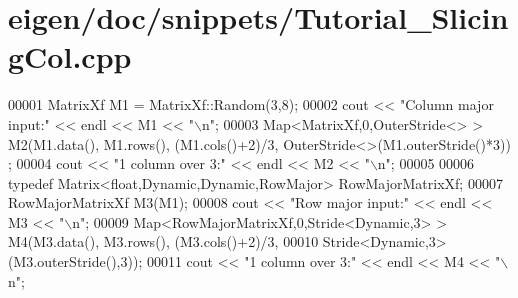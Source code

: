 \hypertarget{eigen_2doc_2snippets_2_tutorial___slicing_col_8cpp_source}{}\section{eigen/doc/snippets/\+Tutorial\+\_\+\+Slicing\+Col.cpp}
\label{eigen_2doc_2snippets_2_tutorial___slicing_col_8cpp_source}

\begin{DoxyCode}
00001 MatrixXf M1 = MatrixXf::Random(3,8);
00002 cout << \textcolor{stringliteral}{"Column major input:"} << endl << M1 << \textcolor{stringliteral}{"\(\backslash\)n"};
00003 Map<MatrixXf,0,OuterStride<> > M2(M1.data(), M1.rows(), (M1.cols()+2)/3, OuterStride<>(M1.outerStride()*3))
      ;
00004 cout << \textcolor{stringliteral}{"1 column over 3:"} << endl << M2 << \textcolor{stringliteral}{"\(\backslash\)n"};
00005 
00006 \textcolor{keyword}{typedef} Matrix<float,Dynamic,Dynamic,RowMajor> RowMajorMatrixXf;
00007 RowMajorMatrixXf M3(M1);
00008 cout << \textcolor{stringliteral}{"Row major input:"} << endl << M3 << \textcolor{stringliteral}{"\(\backslash\)n"};
00009 Map<RowMajorMatrixXf,0,Stride<Dynamic,3> > M4(M3.data(), M3.rows(), (M3.cols()+2)/3,
00010                                               Stride<Dynamic,3>(M3.outerStride(),3));
00011 cout << \textcolor{stringliteral}{"1 column over 3:"} << endl << M4 << \textcolor{stringliteral}{"\(\backslash\)n"};
\end{DoxyCode}
